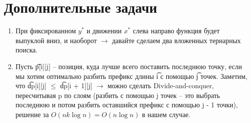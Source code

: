 \documentclass[12pt]{article}
\begin{document}
\section{Дополнительные задачи}

\begin{enumerate}
	\setlength{\parskip}{0pt} 
	\setlength{\itemsep}{0pt} 
	\item При фиксированном $y^*$ и движении $x^*$ слева направо функция будет выпуклой вниз, и наоборот $\to$ давайте сделаем два вложенных тернарных поиска. \\
	\item Пусть \t{p[i][j]} -- позиция, куда лучше всего поставить последнюю точку, если мы хотим оптимально разбить префикс длины \t{i} с помощью \t{j} точек. Заметим, что \t{dp[i][j]} $\le$ \t{dp[i + 1][j]} $\to$ можно сделать Divide-and-conquer, пересчитывая p по слоям (разбить с помощью j точек -- это выбрать последнюю и потом разбить оставшийся префикс с помощью j - 1 точки), решение за $O(nk\log n) = O(n\log n)$ в нашем случае.
\end{enumerate}
\end{document}
